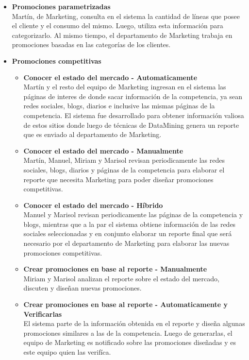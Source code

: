 \begin{itemize}
  \item \textbf{Promociones parametrizadas} \\
    Martín, de Marketing, consulta en el sistema la cantidad de líneas que posee el cliente y el consumo del mismo. Luego, utiliza esta información para categorizarlo.
    Al mismo tiempo, el departamento de Marketing trabaja en promociones basadas en las categorías de los clientes.

  \item \textbf{Promociones competitivas}
  \begin{itemize}
    \item \textbf{Conocer el estado del mercado - Automaticamente} \\
      Martín y el resto del equipo de Marketing ingresan en el sistema las páginas de interes de donde sacar información de la competencia, ya sean redes sociales, blogs, diarios e inclusive las mismas páginas de la competencia. El sistema fue desarrollado para obtener información valiosa de estos sitios donde luego de técnicas de DataMining genera un reporte que es enviado al departamento de Marketing.
    \item \textbf{Conocer el estado del mercado - Manualmente} \\
      Martín, Manuel, Miriam y Marisol revisan periodicamente las redes sociales, blogs, diarios y páginas de la competencia para elaborar el reporte que necesita Marketing para poder diseñar promociones competitivas.
    \item \textbf{Conocer el estado del mercado - Híbrido} \\
      Manuel y Marisol revisan periodicamente las páginas de la competencia y blogs, mientras que a la par el sistema obtiene información de las redes sociales seleccionadas y en conjunto elaborar un reporte final que será necesario por el departamento de Marketing para elaborar las nuevas promociones competitivas.
  \end{itemize}

  \begin{itemize}
    \item \textbf{Crear promociones en base al reporte - Manualmente} \\
      Miriam y Marisol analizan el reporte sobre el estado del mercado, discuten y diseñan nuevas promociones.
    \item \textbf{Crear promociones en base al reporte - Automaticamente y Verificarlas} \\
      El sistema parte de la información obtenida en el reporte y diseña algunas promociones similares a las de la competencia.
      Luego de generarlas, el equipo de Marketing es notificado sobre las promociones diseñadas y es este equipo quien las verifíca.
  \end{itemize}


\end{itemize}
